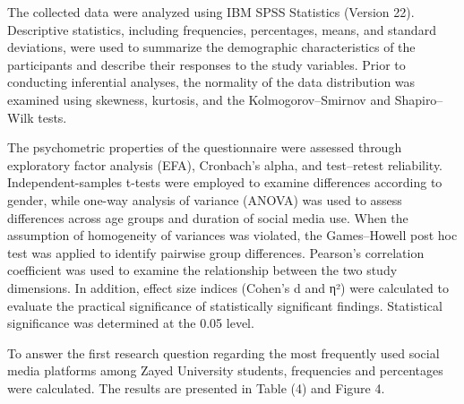 \documentclass[10pt]{NSP1}
\begin{document}
The collected data were analyzed using IBM SPSS Statistics (Version 22). Descriptive statistics, including frequencies, percentages, means, and standard deviations, were used to summarize the demographic characteristics of the participants and describe their responses to the study variables. Prior to conducting inferential analyses, the normality of the data distribution was examined using skewness, kurtosis, and the Kolmogorov–Smirnov and Shapiro–Wilk tests.

The psychometric properties of the questionnaire were assessed through exploratory factor analysis (EFA), Cronbach's alpha, and test–retest reliability. Independent-samples t-tests were employed to examine differences according to gender, while one-way analysis of variance (ANOVA) was used to assess differences across age groups and duration of social media use. When the assumption of homogeneity of variances was violated, the Games–Howell post hoc test was applied to identify pairwise group differences. Pearson's correlation coefficient was used to examine the relationship between the two study dimensions. In addition, effect size indices (Cohen's d and η²) were calculated to evaluate the practical significance of statistically significant findings. Statistical significance was determined at the 0.05 level.

\par\vspace{5.0pt}\vspace{5.0pt}

\par\vspace{5.0pt}\vspace{5.0pt}

To answer the first research question regarding the most frequently used social media platforms among Zayed University students, frequencies and percentages were calculated. The results are presented in Table (4) and Figure 4.
\end{document}
